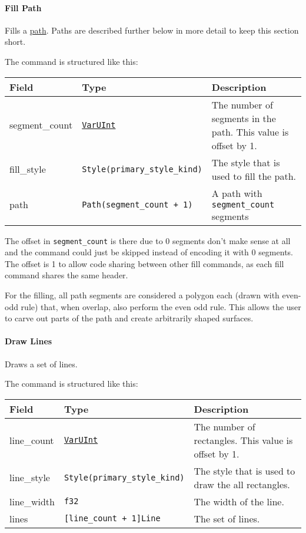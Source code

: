 \documentclass[]{article}
\begin{document}
\hypertarget{fill-path}{%
\paragraph{Fill Path}\label{fill-path}}

Fills a \protect\hyperlink{path}{path}. Paths are described further
below in more detail to keep this section short.

The command is structured like this:

\begin{longtable}[]{@{}p{1in}p{2in}p{3in}@{}}
\toprule
Field & Type & Description \\
\midrule
\endhead
segment\_count & \protect\hyperlink{varuint}{\texttt{VarUInt}} & The
number of segments in the path. This value is offset by 1. \\
fill\_style & \texttt{Style(primary\_style\_kind)} & The style that is
used to fill the path. \\
path & \texttt{Path(segment\_count\ +\ 1)} & A path with
\texttt{segment\_count} segments \\
\bottomrule
\end{longtable}

The offset in \texttt{segment\_count} is there due to 0 segments don't
make sense at all and the command could just be skipped instead of
encoding it with 0 segments. The offset is 1 to allow code sharing
between other fill commands, as each fill command shares the same
header.

For the filling, all path segments are considered a polygon each (drawn
with even-odd rule) that, when overlap, also perform the even odd rule.
This allows the user to carve out parts of the path and create
arbitrarily shaped surfaces.

\hypertarget{draw-lines}{%
\paragraph{Draw Lines}\label{draw-lines}}

Draws a set of lines.

The command is structured like this:

\begin{longtable}[]{@{}p{1in}p{2in}p{3in}@{}}
\toprule
Field & Type & Description \\
\midrule
\endhead
line\_count & \protect\hyperlink{varuint}{\texttt{VarUInt}} & The number of rectangles. This value is offset by 1. \\
line\_style & \texttt{Style(primary\_style\_kind)} & The style that is used to draw the all rectangles. \\
line\_width & \texttt{f32} & The width of the line. \\
lines & \texttt{{[}line\_count\ +\ 1{]}Line} & The set of lines. \\
\bottomrule
\end{longtable}
\end{document}
